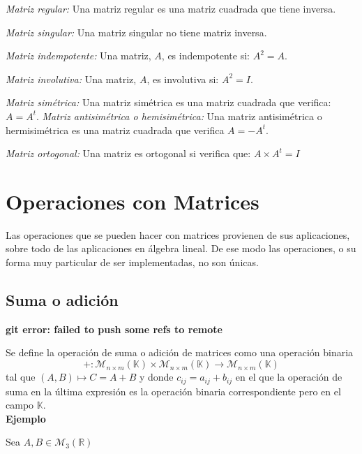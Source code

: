 \documentclass[10pt]{article}
\begin{document}
\begin{itemize}
\textit{Matriz regular:} Una matriz  regular es una matriz cuadrada que tiene inversa.

\textit{Matriz singular:} Una matriz  singular no tiene matriz inversa.

\textit{Matriz indempotente:} Una matriz, $A$, es indempotente si: $A^2 = A$.

\textit{Matriz involutiva:} Una matriz, $A$, es involutiva si: $A^2 = I$.

\textit{Matriz simétrica:} Una matriz simétrica es una matriz cuadrada que verifica: $A = A^t$.
\textit{Matriz antisimétrica o hemisimétrica:} Una matriz antisimétrica o hermisimétrica es una matriz cuadrada que verifica $A = -A^t$.

\textit{Matriz ortogonal:} Una matriz es ortogonal si verifica que: $A\times {A^t} = I$

\end{itemize}

\section{Operaciones con Matrices}
Las operaciones que se pueden hacer con matrices provienen de sus aplicaciones, sobre todo de las aplicaciones en álgebra lineal. De ese modo las operaciones, o su forma muy particular de ser implementadas, no son únicas.

\subsection{Suma o adición}

\noindent \textbf{git error: failed to push some refs to remote}

Se define la operación de suma o adición de matrices como una operación binaria
$$
+ : \mathcal{M}_{n\times {m}}(\mathbb{K})\times {\mathcal{M}_{n\times {m}}(\mathbb{K})} \rightarrow \mathcal{M}_{n\times {m}}(\mathbb{K})
$$
tal que $(A, B) \longmapsto C = A+B$ y donde $c_{ij} = a_{ij} + b_{ij}$ en el que la operación de suma en la última expresión es la operación binaria correspondiente pero en el campo $\mathbb{K}$. \\

\noindent \textbf{Ejemplo}

Sea $A, B \in \mathcal{M_3}(\mathbb{R})$
\end{document}
